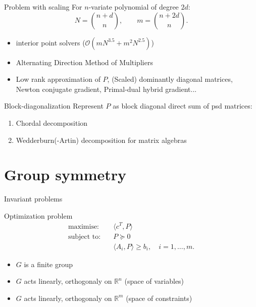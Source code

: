 \documentclass[9pt]{beamer}
\theoremstyle{definition}
\newcommand{\comment}[1]{{\footnotesize \color{black!50}{#1}}}
\begin{document}
\begin{frame}{Problem with scaling}
  For $n$-variate polynomial of degree $2d$:
  \[N = {n + d \choose n},\qquad m = {n + 2d \choose n}.\]
  \pause
  \vspace*{-0.1in}
  \begin{itemize}
    \item interior point solvers ($\mathcal{O}(mN^{3.5} + m^2N^{2.5})$)\\
    {\footnotesize\color{black!50}{CSDP, DSDP, Hypatia, MOSEK, SDPA, ...}}
    \item Alternating Direction Method of Multipliers\\
    {\footnotesize\color{black!50}{CDCS, COSMO, SCS, ...}}
    \item Low rank approximation of $P$, (Scaled) dominantly diagonal matrices, Newton conjugate gradient, Primal-dual hybrid gradient...
  \end{itemize}

  \pause
  \begin{exampleblock}{Block-diagonalization}
     Represent $P$ as block diagonal direct sum of psd matrices:
      \begin{enumerate}
        \item Chordal decomposition \comment{(exploit sparsity pattern in $A_i$s)}
        \item Wedderburn(-Artin) decomposition for matrix algebras \\\comment{(group symmetry, general *-algebras, Jordan algebras, ...)}
      \end{enumerate}
  \end{exampleblock}

\end{frame}

\section{Group symmetry}

\begin{frame}{Invariant problems}
\begin{exampleblock}{Optimization problem}
  \begin{align*}
    \text{maximise:}\quad  & \langle c^T, P \rangle\\
    \text{subject to:}\quad      & P \succcurlyeq 0\\
          & \langle A_i, P \rangle \geqslant b_i, \quad i = 1,\ldots, m.
  \end{align*}
\end{exampleblock}

\begin{itemize}
  \item $G$ is a finite group
  \item $G$ acts linearly, orthogonaly on $\mathbb{R}^n$ (space of variables)
  \item $G$ acts linearly, orthogonaly on $\mathbb{R}^m$ (space of constraints)
\end{itemize}

\end{frame}
\end{document}
